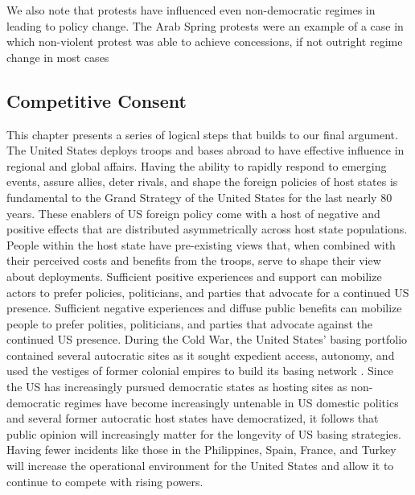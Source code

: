 {	%

	We also note that protests have influenced even non-democratic regimes in leading to policy change. The Arab Spring protests were an example of a case in which non-violent protest was able to achieve concessions, if not outright regime change in most cases \cite{Chenoweth2013}
	
\subsection*{Competitive Consent}
	
	This chapter presents a series of logical steps that builds to our final argument. The United States deploys troops and bases abroad to have effective influence in regional and global affairs. Having the ability to rapidly respond to emerging events, assure allies, deter rivals, and shape the foreign policies of host states is fundamental to the Grand Strategy of the United States for the last nearly 80 years. These enablers of US foreign policy come with a host of negative and positive effects that are distributed asymmetrically across host state populations. People within the host state have pre-existing views that, when combined with their perceived costs and benefits from the troops, serve to shape their view about deployments. Sufficient positive experiences and support can mobilize actors to prefer policies, politicians, and parties that advocate for a continued US presence. Sufficient negative experiences and diffuse public benefits can mobilize people to prefer polities, politicians, and parties that advocate against the continued US presence. During the Cold War, the United States' basing portfolio contained several autocratic sites as it sought expedient access, autonomy, and used the vestiges of former colonial empires to build its basing network \cite{calder2007,Harkavy2013}. Since the US has increasingly pursued democratic states as hosting sites as non-democratic regimes have become increasingly untenable in US domestic politics and several former autocratic host states have democratized, it follows that public opinion will increasingly matter for the longevity of US basing strategies. Having fewer incidents like those in the Philippines, Spain, France, and Turkey will increase the operational environment for the United States and allow it to continue to compete with rising powers. 
	
}

